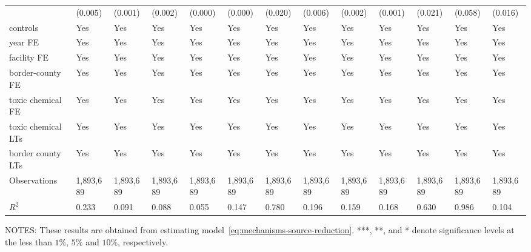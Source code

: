 \begin{table}[H]
{\begin{tabular}{@{}lllllllllllll@{}}
            & (0.005)    & (0.001)             & (0.002)                & (0.000)         & (0.000)      & (0.020)    & (0.006)   & (0.002)   & (0.001)       & (0.021)  & (0.058)    & (0.016)  \\
            controls           & Yes        & Yes                 & Yes                    & Yes             & Yes          & Yes        & Yes       & Yes       & Yes           & Yes           & Yes                    & Yes       \\
            year FE            & Yes        & Yes                 & Yes                    & Yes             & Yes          & Yes        & Yes       & Yes       & Yes           & Yes           & Yes                    & Yes       \\
            facility FE        & Yes        & Yes                 & Yes                    & Yes             & Yes          & Yes        & Yes       & Yes       & Yes           & Yes           & Yes                    & Yes       \\
            border-county FE   & Yes        & Yes                 & Yes                    & Yes             & Yes          & Yes        & Yes       & Yes       & Yes           & Yes           & Yes                    & Yes       \\
            toxic chemical FE  & Yes        & Yes                 & Yes                    & Yes             & Yes          & Yes        & Yes       & Yes       & Yes           & Yes           & Yes                    & Yes       \\
            toxic chemical LTs & Yes        & Yes                 & Yes                    & Yes             & Yes          & Yes        & Yes       & Yes       & Yes           & Yes           & Yes                    & Yes       \\
            border county LTs  & Yes        & Yes                 & Yes                    & Yes             & Yes          & Yes        & Yes       & Yes       & Yes           & Yes           & Yes                    & Yes       \\\midrule
            Observations       & 1,893,689  & 1,893,689           & 1,893,689              & 1,893,689       & 1,893,689    & 1,893,689  & 1,893,689 & 1,893,689 & 1,893,689     & 1,893,689  & 1,893,689  & 1,893,689 \\
            $R^2$              & 0.233      & 0.091               & 0.088                  & 0.055           & 0.147        & 0.780      & 0.196     & 0.159     & 0.168         & 0.630         & 0.986                  & 0.104     \\ \bottomrule\bottomrule
        \end{tabular}%
    }
    \begin{minipage}{\columnwidth}
        \vspace{0.05in}
        \tiny NOTES: These results are obtained from estimating model~\ref{eq:mechanisms-source-reduction}. ***, **, and * denote significance levels at the less than $1\%$, $5\%$ and $10\%$, respectively.
    \end{minipage}
\end{table}